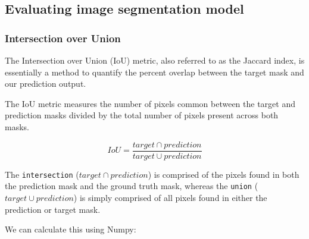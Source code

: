 \documentclass[11pt]{article}
\begin{document}
    \hypertarget{evaluating-image-segmentation-model}{%
\subsection{Evaluating image segmentation
model}\label{evaluating-image-segmentation-model}}

\hypertarget{intersection-over-union}{%
\subsubsection{Intersection over Union}\label{intersection-over-union}}

The Intersection over Union (IoU) metric, also referred to as the
Jaccard index, is essentially a method to quantify the percent overlap
between the target mask and our prediction output.

The IoU metric measures the number of pixels common between the target
and prediction masks divided by the total number of pixels present
across both masks.

\[IoU = \frac{target \cap prediction}{target \cup prediction}\]

The \texttt{intersection} (\(target \cap prediction\)) is comprised of
the pixels found in both the prediction mask and the ground truth mask,
whereas the \texttt{union} (\(target \cup prediction\)) is simply
comprised of all pixels found in either the prediction or target mask.

We can calculate this using Numpy:
\end{document}
